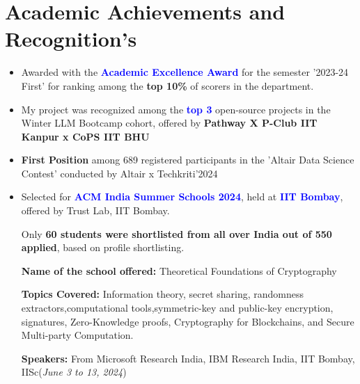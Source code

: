 \documentclass[10.8pt, a4paper]{extarticle}
\newcommand{\shorterSection}[1]{\vspace{-10pt}\section{#1}}
\begin{document}
\shorterSection{Academic Achievements and Recognition's}
\begin{itemize}

 \item Awarded with the \textcolor{blue}{\textbf{Academic Excellence Award}} for the semester '2023-24 First' for ranking among the \textbf{top 10\%} of scorers in the department.\href{https://www.iitk.ac.in/sspc/data/2nd-list-of-Academic-Excellence-Awards-2023-21-03-24.pdf}{\faLink{}} \href{https://drive.google.com/file/d/1jnb98lF2TscnxkIrKWC_X26nIbIIifDF/view?usp=sharing}{\faLink{}} \\[-0.6cm]
 
 
  \item My project was recognized among the \textcolor{blue}{\textbf{top 3 }}open-source projects in the Winter LLM Bootcamp cohort, offered by \textbf{Pathway X P-Club IIT Kanpur x CoPS IIT BHU} \href{https://t.certifier.io/CL0/https:%2F%2Fapi.credsverse.com%2Fv1%2Fusers%2Finvite%2Fceed2b44-26ae-4085-a1c6-291760efed0a/1/0102018ede88dc5e-89a09bd7-6cea-4807-a2c9-3dff747834d9-000000/_U00joiSf7_qp3anDSJNAiO00y7Hxm7ONFmpv6zOP2g=348}{\faLink{}}\\[-0.6cm]

  \item \textbf{First Position} among 689 registered participants in the 'Altair Data Science Contest' conducted by Altair x Techkriti'2024 \href{https://drive.google.com/file/d/1D9f-N0dg1hDBg25C0PcwicyXPSVoKH6y/view?usp=sharing}{\faLink{}}


    \item Selected for \textcolor{blue}{\textbf{ACM India Summer Schools 2024}}, held at \textcolor{blue}{\textbf{IIT Bombay}}, offered by Trust Lab, IIT Bombay. \href{https://drive.google.com/file/d/1mHDlgpKEQpYF-BHE-QLPfYljADycJgEZ/view?usp=sharing}{\faLink{}}
    \href{https://trustlab.iitb.ac.in/trust-matters-2024-jun-summer-school-on-cryptography}{\faLink{}}
    
    Only \textbf{60 students were shortlisted from all over India out of 550 applied}, based on profile shortlisting. 
    
    \textbf{Name of the school offered:} Theoretical Foundations of Cryptography 
    
    \textbf{Topics Covered:} Information theory, secret sharing, randomness extractors,computational tools,symmetric-key and public-key encryption, signatures, Zero-Knowledge proofs, Cryptography for Blockchains, and Secure Multi-party Computation.
    
    \textbf{Speakers:} From Microsoft Research India, IBM Research India, IIT Bombay, IISc\hfill\hfill(\textit{June 3 to 13, 2024})\\[-0.6cm]



\end{itemize}
\medskip
\end{document}

